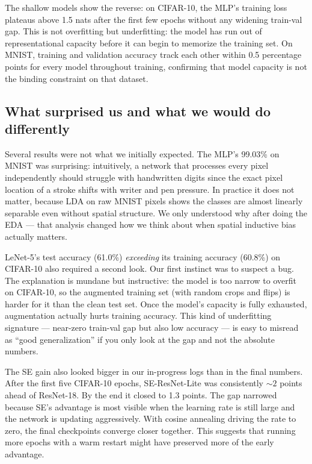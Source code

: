 \documentclass[conference,10pt]{IEEEtran}
\begin{document}
The shallow models show the reverse: on CIFAR-10, the MLP's training
loss plateaus above 1.5 nats after the first few epochs without any
widening train-val gap. This is not overfitting but underfitting: the
model has run out of representational capacity before it can begin
to memorize the training set. On MNIST, training and validation
accuracy track each other within 0.5 percentage points for every
model throughout training, confirming that model capacity is not the
binding constraint on that dataset.

\subsection{What surprised us and what we would do differently}

Several results were not what we initially expected. The MLP's
99.03\% on MNIST was surprising: intuitively, a network that
processes every pixel independently should struggle with handwritten
digits since the exact pixel location of a stroke shifts with
writer and pen pressure. In practice it does not matter, because
LDA on raw MNIST pixels shows the classes are almost linearly
separable even without spatial structure. We only understood why
after doing the EDA --- that analysis changed how we think about
when spatial inductive bias actually matters.

LeNet-5's test accuracy (61.0\%) \emph{exceeding} its training
accuracy (60.8\%) on CIFAR-10 also required a second look. Our first
instinct was to suspect a bug. The explanation is mundane but
instructive: the model is too narrow to overfit on CIFAR-10, so the
augmented training set (with random crops and flips) is harder for
it than the clean test set. Once the model's capacity is
fully exhausted, augmentation actually hurts training accuracy.
This kind of underfitting signature --- near-zero train-val gap but
also low accuracy --- is easy to misread as ``good generalization''
if you only look at the gap and not the absolute numbers.

The SE gain also looked bigger in our in-progress logs than in the
final numbers. After the first five CIFAR-10 epochs, SE-ResNet-Lite
was consistently $\sim\!2$ points ahead of ResNet-18. By the end it
closed to 1.3 points. The gap narrowed because SE's advantage is most
visible when the learning rate is still large and the network is
updating aggressively. With cosine annealing driving the rate to
zero, the final checkpoints converge closer together. This suggests
that running more epochs with a warm restart might have preserved
more of the early advantage.
\end{document}
